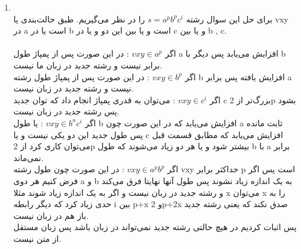 \begin{enumerate}
          \item \phantom{text}
          \\
          برای حل این سوال رشته $s=a^pb^pc^i$ را در نظر می‌گیریم. طبق حالت‌بندی یا vxy در a است یا در b است و یا بین این دو و یا در c و یا بین b , c.\\
          \\
          اگر $vxy \in a^p$ : 
          در این صورت پس از پمپاژ طول a افزایش می‌یابد پس دیگر با b برابر نیست و رشته جدید در زبان ما نیست.
          \\
          اگر $vxy \in b^p$ : 
          در این صورت پس از پمپاژ طول رشته b افزایش یافته پس برابر a نیست و رشته جدید در زبان نیست.\\
          اگر $vxy \in c^i$ :
          می‌توان به قدری پمپاژ انجام داد که توان جدید c بزرگ‌تر از 2p بشود پس رشته جدید در زبان نیست.\\
          اگر $vxy \in b^nc^i$ :
          یا طول b افزایش می‌یابد که در این صورت چون a ثابت مانده پس طول جدید این دو یکی نیست و یا c افزایش می‌یابد که مطابق قسمت قبل می‌توان کاری کرد از 2p بیشتر شود و یا هر دو زیاد می‌شوند که طول b با a برابر نمی‌ماند.
          \\
          اگر $vxy \in a^pb^p$ : 
         در این صورت چون طول رشته vxy حداکثر برابر p است پس اگر فرض کنیم هر دوی a و b به یک اندازه زیاد نشوند پس طول آنها نهایتا فرق می‌کند و رشته جدید در زبان نیست و اگر به یک اندازه زیاد شوند مثلا x می‌توان x را به حدی زیاد کرد که دیگر رابطه i بین p+x و 2p+2x صدق نکند که یعنی رشته جدید باز هم در زبان نیست.\\
         پس اثبات کردیم در هیچ حالتی رشته جدید نمی‌تواند در زبان باشد پس زبان مستقل از متن نیست.

        
\end{enumerate}